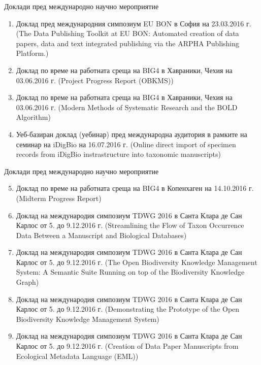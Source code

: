 \documentclass[bulgarian]{beamer}
\begin{document}
\begin{frame}{Доклади пред международно научно мероприятие}

\begin{enumerate}
    \item Доклад пред международния симпозиум EU BON в София на 23.03.2016 г. (The Data Publishing Toolkit at EU BON: Automated creation of data papers, data and text integrated publishing via the ARPHA Publishing Platform.)
    \item Доклад по време на работната среща на BIG4 в Хавраники, Чехия на 03.06.2016 г. (Project Progress Report (OBKMS))
    \item Доклад по време на работната среща на BIG4 в Хавраники, Чехия на 03.06.2016 г. (Modern Methods of Systematic Research and the BOLD Algorithm)
    \item Уеб-базиран доклад (уебинар) пред международна аудитория в рамките на семинар на iDigBio на 16.07.2016 г. (Online direct import of specimen records from iDigBio instrastructure into taxonomic manuscripts)
    
    \end{enumerate}
\end{frame}


\begin{frame}{Доклади пред международно научно мероприятие}
\begin{enumerate}
\setcounter{enumi}{4}
    \item Доклад по време на работната среща на BIG4 в Копенхаген на 14.10.2016 г. (Midterm Progress Report)
    \item Доклад на международия симпозиум TDWG 2016 в Санта Клара де Сан Карлос от 5. до 9.12.2016 г. (Streamlining the Flow of Taxon Occurrence Data Between a Manuscript and Biological Databases)
    \item Доклад на международия симпозиум TDWG 2016 в Санта Клара де Сан Карлос от 5. до 9.12.2016 г. (The Open Biodiversity Knowledge Management System: A Semantic Suite Running on top of the Biodiversity Knowledge Graph)
    \item Доклад на международия симпозиум TDWG 2016 в Санта Клара де Сан Карлос от 5. до 9.12.2016 г. (Demonstrating the Prototype of the Open Biodiversity Knowledge Management System)
    \item Доклад на международия симпозиум TDWG 2016 в Санта Клара де Сан Карлос от 5. до 9.12.2016 г. (Creation of Data Paper Manuscripts from Ecological Metadata Language (EML))
   
\end{enumerate}
\end{frame}
\end{document}
